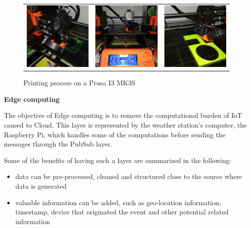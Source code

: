 \begin{figure}[!htb]
    \centering
    \begin{tabular}{lll}
        \includegraphics[width=4.8cm]{figures/print2} &
        \includegraphics[width=4.8cm]{figures/print1} &
        \includegraphics[width=4.8cm]{figures/print3}
    \end{tabular}
    \caption{Printing process on a Prusa I3 MK3S}
    \label{fig:printingTheModel}
\end{figure}

\vspace{0.4cm}\textbf{Edge computing}\vspace{0.4cm}

The objective of Edge computing is to remove the computational burden of IoT caused to Cloud. This layer is represented by the weather station's computer, the Raspberry Pi, which handles some of the computations before sending the messages through the PubSub layer. 

Some of the benefits of having such a layer are summarized in the following:
\begin{itemize}
    \item {data can be pre-processed, cleaned and structured close to the source where data is generated}
    \item {valuable information can be added, such as geo-location information, timestamp, device that originated the event and other potential related information}
\end{itemize}

